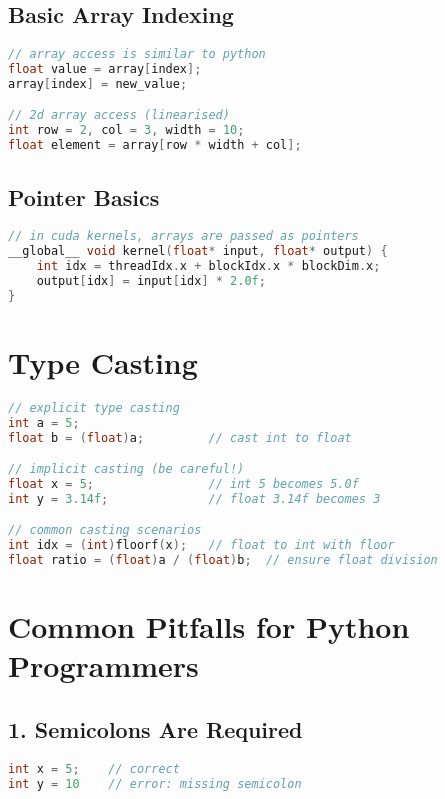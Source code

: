 \documentclass[11pt, a4paper]{article}
\begin{document}
\subsection*{Basic Array Indexing}

\begin{lstlisting}[language=C]
// array access is similar to python
float value = array[index];
array[index] = new_value;

// 2d array access (linearised)
int row = 2, col = 3, width = 10;
float element = array[row * width + col];
\end{lstlisting}

\subsection*{Pointer Basics}

\begin{lstlisting}[language=C]
// in cuda kernels, arrays are passed as pointers
__global__ void kernel(float* input, float* output) {
    int idx = threadIdx.x + blockIdx.x * blockDim.x;
    output[idx] = input[idx] * 2.0f;
}
\end{lstlisting}

\section*{Type Casting}

\begin{lstlisting}[language=C]
// explicit type casting
int a = 5;
float b = (float)a;         // cast int to float

// implicit casting (be careful!)
float x = 5;                // int 5 becomes 5.0f
int y = 3.14f;              // float 3.14f becomes 3

// common casting scenarios
int idx = (int)floorf(x);   // float to int with floor
float ratio = (float)a / (float)b;  // ensure float division
\end{lstlisting}

\section*{Common Pitfalls for Python Programmers}

\subsection*{1. Semicolons Are Required}
\begin{lstlisting}[language=C]
int x = 5;    // correct
int y = 10    // error: missing semicolon
\end{lstlisting}
\end{document}
